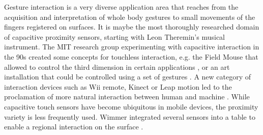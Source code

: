 Gesture interaction is a very diverse application area that reaches from the acquisition and interpretation of whole body gestures to small movements of the fingers registered on surfaces. It is maybe the most thoroughly researched domain of capacitive proximity sensors, starting with Leon Theremin's musical instrument. The MIT research group experimenting with capacitive interaction in the 90s created some concepts for touchless interaction, e.g. the Field Mouse that allowed to control the third dimension in certain applications \cite{Smith1996a}, or an art installation that could be controlled using a set of gestures \cite{smith1998electric}. A new category of interaction devices such as Wii remote, Kinect or Leap motion led to the proclamation of more natural interaction between human and machine \cite{Valli2008}. While capacitive touch sensors have become ubiquitous in mobile devices, the proximity variety is less frequently used. Wimmer integrated several sensors into a table to enable a regional interaction on the surface \cite{Wimmer2006}. 

